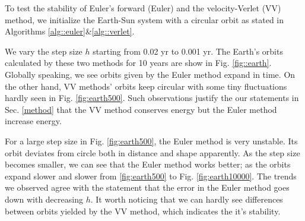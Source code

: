To test the stability of Euler's forward (Euler) and the velocity-Verlet (VV) method, we initialize the Earth-Sun system with a circular orbit as stated in Algorithms \ref{alg::euler}\&\ref{alg::verlet}.

We vary the step size $h$ starting from 0.02 yr to 0.001 yr.
The Earth's orbits calculated by these two methods for 10 years are show in Fig. \ref{fig::earth}. 
Globally speaking, we see orbits given by the Euler method expand in time.  
On the other hand, VV methods' orbits keep circular with some tiny fluctuations hardly seen in Fig. \ref{fig:earth500}.
Such observations justify the our statements in Sec. \ref{method} that the VV method conserves energy but the Euler method increase energy.

For a large step size in Fig. \ref{fig:earth500}, the Euler method is very unstable. Its orbit deviates from circle both in distance and shape apparently. 
As the step size becomes smaller, we can see that the Euler method works better; as the orbits expand slower and slower from \ref{fig:earth500} to Fig. \ref{fig:earth10000}.
 The trends we observed agree with the statement that the error in the Euler method goes down with decreasing $h$. It worth noticing that we can hardly see differences between orbits yielded by the VV method, which indicates the it's stability.
 
